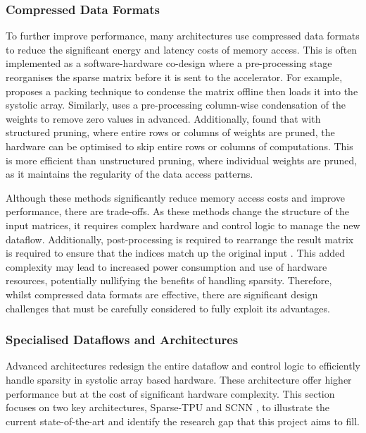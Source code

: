 \documentclass[12pt, a4paper, ukenglish]{article}
\begin{document}
        \subsubsection{Compressed Data Formats} \label{sec: compressed}
        To further improve performance, many architectures use compressed data formats to reduce the significant energy and latency costs of memory access. This is often implemented as a software-hardware co-design where a pre-processing stage reorganises the sparse matrix before it is sent to the accelerator. For example, \textcite{he_sparse-tpu_2020} proposes a packing technique to condense the matrix offline then loads it into the systolic array. Similarly, \textcite{seo_versa_2024} uses a pre-processing column-wise condensation of the weights to remove zero values in advanced. Additionally, \textcite{palacios_systolic_2025,kim_fpga_2021} found that with structured pruning, where entire rows or columns of weights are pruned, the hardware can be optimised to skip entire rows or columns of computations. This is more efficient than unstructured pruning, where individual weights are pruned, as it maintains the regularity of the data access patterns.

        Although these methods significantly reduce memory access costs and improve performance, there are trade-offs. As these methods change the structure of the input matrices, it requires complex hardware and control logic to manage the new dataflow. Additionally, post-processing is required to rearrange the result matrix is required to ensure that the indices match up the original input \textcite{seo_versa_2024}. This added complexity may lead to increased power consumption and use of hardware resources, potentially nullifying the benefits of handling sparsity. Therefore, whilst compressed data formats are effective, there are significant design challenges that must be carefully considered to fully exploit its advantages.

        \subsubsection{Specialised Dataflows and Architectures} \label{sec: dataflow}
        Advanced architectures redesign the entire dataflow and control logic to efficiently handle sparsity in systolic array based hardware. These architecture offer higher performance but at the cost of significant hardware complexity. This section focuses on two key architectures, Sparse-TPU \cite{he_sparse-tpu_2020} and SCNN \cite{parashar_scnn_2017}, to illustrate the current state-of-the-art and identify the research gap that this project aims to fill. 
\end{document}
